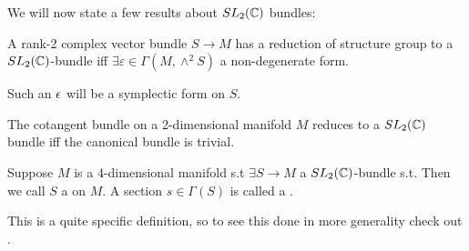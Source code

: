 \documentclass{article}
\begin{document}
We will now state a few results about $SL_2(\mathbb{C})$ bundles:
\begin{lemma}
	A rank-2 complex vector bundle $S \to M$ has a reduction of structure group to a $SL_2(\mathbb{C})$-bundle iff $\exists \varepsilon \in \Gamma(M,\wedge^2 S)$ a non-degenerate form. 
\end{lemma}

\begin{remark}
	Such an $\epsilon$ will be a symplectic form on $S$.
\end{remark}

\begin{corollary}
	The cotangent bundle on a 2-dimensional manifold $M$ reduces to a $SL_2(\mathbb{C})$ bundle iff the canonical bundle is trivial.  
\end{corollary}

\begin{definition}\label{def:spinor bundle}
	Suppose $M$ is a 4-dimensional manifold s.t $\exists S \to M$ a $SL_2(\mathbb{C})$-bundle s.t. 
Then we call $S$ a  on  $M$. A section $s \in \Gamma(S)$ is called a .   
\end{definition}

\begin{remark}
	This is a quite specific definition, so to see this done in more generality check out \cite{Michelsohn1989}. 
\end{remark}
\end{document}
